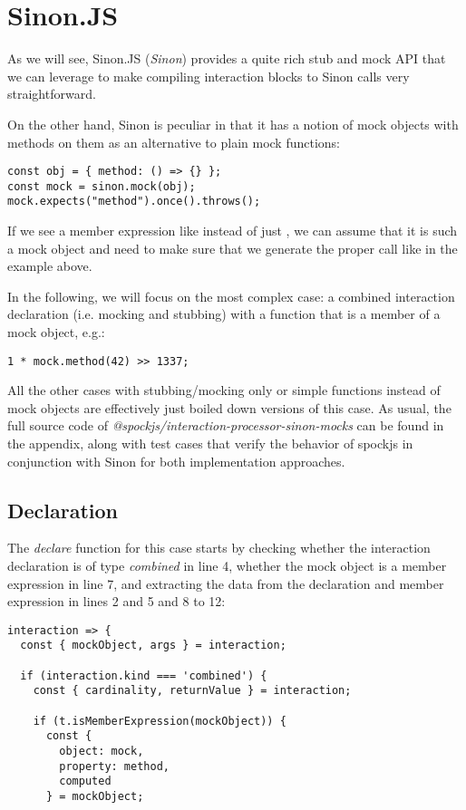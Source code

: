 \section{Sinon.JS}
As we will see,
Sinon.JS (\textit{Sinon}) provides a
quite rich stub and mock API
that we can leverage to make
compiling interaction blocks
to Sinon calls very straightforward.

On the other hand,
Sinon is peculiar in that it has a notion of
mock objects with methods on them
as an alternative to plain mock functions:
\autocite{SinonMockDoc}
\begin{verbatim}
const obj = { method: () => {} };
const mock = sinon.mock(obj);
mock.expects("method").once().throws();
\end{verbatim}
If we see a member expression like
instead of just
,
we can assume that it is such a mock object
and need to make sure that
we generate the proper  call
like in the example above.

In the following,
we will focus on the most complex case:
a combined interaction declaration
(i.e. mocking and stubbing) with a
function that is a member of a mock object, e.g.:
\begin{verbatim}
1 * mock.method(42) >> 1337;
\end{verbatim}
All the other cases with
stubbing/mocking only
or simple functions
instead of mock objects
are effectively just
boiled down versions of this case.
As usual, the full source code of
\textit{@spockjs/interaction-processor-sinon-mocks}
can be found in the appendix,
along with test cases that verify
the behavior of spockjs in conjunction with Sinon
for both implementation approaches.

\subsection{Declaration}
The \textit{declare} function for this case starts by
checking whether the interaction declaration is of type \textit{combined} in line 4,
whether the mock object is a member expression in line 7, and
extracting the data from the declaration and member expression
in lines 2 and 5 and 8 to 12:
\begin{verbatim}
interaction => {
  const { mockObject, args } = interaction;

  if (interaction.kind === 'combined') {
    const { cardinality, returnValue } = interaction;

    if (t.isMemberExpression(mockObject)) {
      const {
        object: mock,
        property: method,
        computed
      } = mockObject;
\end{verbatim}

